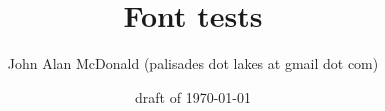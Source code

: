 \documentclass{PalisadesLakesArticle}
\title{Font tests}
\author{John Alan McDonald 
(palisades dot lakes at gmail dot com)}
\date{draft of \today}
\begin{document}
\def\sharedFolder{../shared/}



\end{document}
